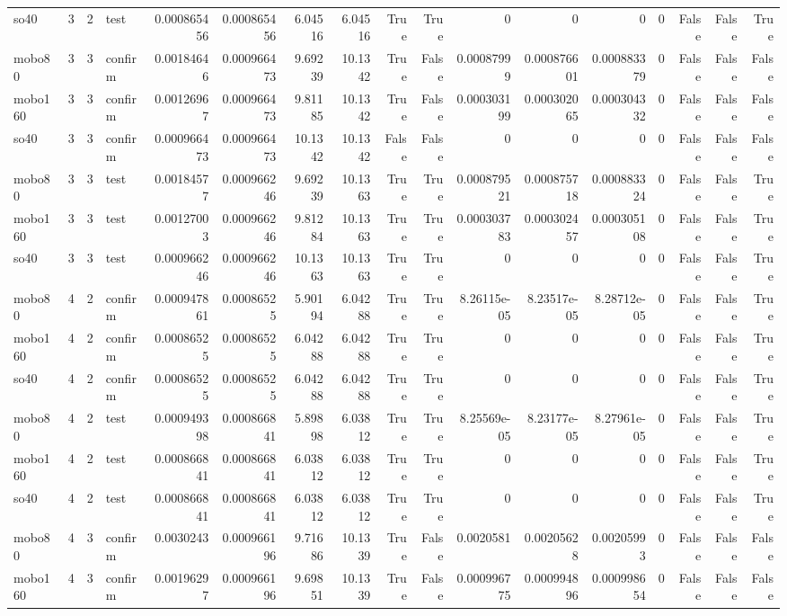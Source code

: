 \begin{tabular}{lrrlrrrrrrrrrrrrr}
so40 & 3 & 2 & test & 0.000865456 & 0.000865456 & 6.04516 & 6.04516 & True & True & 0 & 0 & 0 & 0 & False & False & True \\
mobo80 & 3 & 3 & confirm & 0.00184646 & 0.000966473 & 9.69239 & 10.1342 & True & False & 0.00087999 & 0.000876601 & 0.000883379 & 0 & False & False & False \\
mobo160 & 3 & 3 & confirm & 0.00126967 & 0.000966473 & 9.81185 & 10.1342 & True & False & 0.000303199 & 0.000302065 & 0.000304332 & 0 & False & False & False \\
so40 & 3 & 3 & confirm & 0.000966473 & 0.000966473 & 10.1342 & 10.1342 & False & False & 0 & 0 & 0 & 0 & False & False & False \\
mobo80 & 3 & 3 & test & 0.00184577 & 0.000966246 & 9.69239 & 10.1363 & True & True & 0.000879521 & 0.000875718 & 0.000883324 & 0 & False & False & True \\
mobo160 & 3 & 3 & test & 0.00127003 & 0.000966246 & 9.81284 & 10.1363 & True & True & 0.000303783 & 0.000302457 & 0.000305108 & 0 & False & False & True \\
so40 & 3 & 3 & test & 0.000966246 & 0.000966246 & 10.1363 & 10.1363 & True & True & 0 & 0 & 0 & 0 & False & False & True \\
mobo80 & 4 & 2 & confirm & 0.000947861 & 0.00086525 & 5.90194 & 6.04288 & True & True & 8.26115e-05 & 8.23517e-05 & 8.28712e-05 & 0 & False & False & True \\
mobo160 & 4 & 2 & confirm & 0.00086525 & 0.00086525 & 6.04288 & 6.04288 & True & True & 0 & 0 & 0 & 0 & False & False & True \\
so40 & 4 & 2 & confirm & 0.00086525 & 0.00086525 & 6.04288 & 6.04288 & True & True & 0 & 0 & 0 & 0 & False & False & True \\
mobo80 & 4 & 2 & test & 0.000949398 & 0.000866841 & 5.89898 & 6.03812 & True & True & 8.25569e-05 & 8.23177e-05 & 8.27961e-05 & 0 & False & False & True \\
mobo160 & 4 & 2 & test & 0.000866841 & 0.000866841 & 6.03812 & 6.03812 & True & True & 0 & 0 & 0 & 0 & False & False & True \\
so40 & 4 & 2 & test & 0.000866841 & 0.000866841 & 6.03812 & 6.03812 & True & True & 0 & 0 & 0 & 0 & False & False & True \\
mobo80 & 4 & 3 & confirm & 0.0030243 & 0.000966196 & 9.71686 & 10.1339 & True & False & 0.0020581 & 0.00205628 & 0.00205993 & 0 & False & False & False \\
mobo160 & 4 & 3 & confirm & 0.00196297 & 0.000966196 & 9.69851 & 10.1339 & True & False & 0.000996775 & 0.000994896 & 0.000998654 & 0 & False & False & False \\

\end{tabular}
